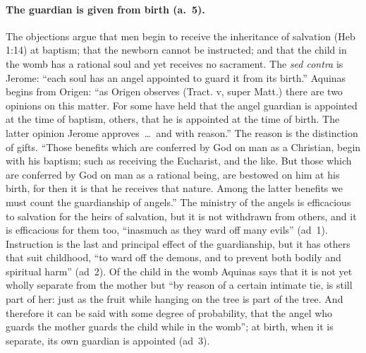\paragraph{The guardian is given from birth (a.~5).} The objections argue
that men begin to receive the inheritance of salvation (Heb 1:14) at
baptism; that the newborn cannot be instructed; and that the child in the
womb has a rational soul and yet receives no sacrament. The \emph{sed contra} is
Jerome: ``each soul has an angel appointed to guard it from its birth.''
Aquinas begins from Origen: ``as Origen observes (Tract. v, super Matt.)
there are two opinions on this matter. For some have held that the angel
guardian is appointed at the time of baptism, others, that he is appointed
at the time of birth. The latter opinion Jerome approves~\dots\ and with
reason.'' The reason is the distinction of gifts. ``Those benefits which are
conferred by God on man as a Christian, begin with his baptism; such as
receiving the Eucharist, and the like. But those which are conferred by God
on man as a rational being, are bestowed on him at his birth, for then it is
that he receives that nature. Among the latter benefits we must count the
guardianship of angels.'' The ministry of the angels is efficacious to
salvation for the heirs of salvation, but it is not withdrawn from others,
and it is efficacious for them too, ``inasmuch as they ward off many evils''
(ad~1). Instruction is the last and principal effect of the guardianship, but
it has others that suit childhood, ``to ward off the demons, and to prevent
both bodily and spiritual harm'' (ad~2). Of the child in the womb Aquinas
says that it is not yet wholly separate from the mother but ``by reason of a
certain intimate tie, is still part of her: just as the fruit while hanging
on the tree is part of the tree. And therefore it can be said with some
degree of probability, that the angel who guards the mother guards the child
while in the womb''; at birth, when it is separate, its own guardian is
appointed (ad~3).


